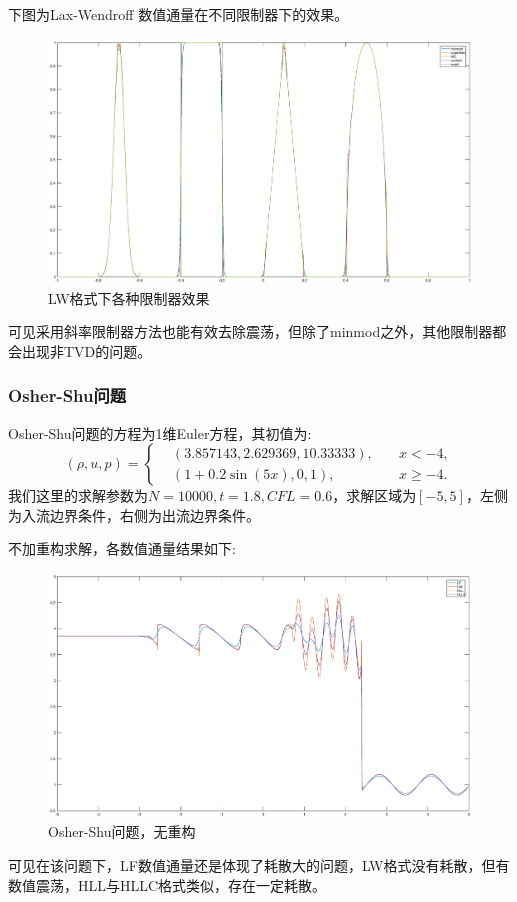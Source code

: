 \documentclass[a4paper,  11pt]{ctexart}
\begin{document}
\newpage 
下图为Lax-Wendroff 数值通量在不同限制器下的效果。
\begin{figure}[H]
  \begin{center}
    \includegraphics[width=\textwidth]{./images/advection_LW_all.eps}
  \end{center}
  \caption{LW格式下各种限制器效果}
\end{figure}
可见采用斜率限制器方法也能有效去除震荡，但除了minmod之外，其他限制器都
会出现非TVD的问题。
\subsubsection{Osher-Shu问题}
Osher-Shu问题的方程为1维Euler方程，其初值为:
\[(\rho,u,p)=\left\{
 \begin{aligned}
  & (3.857143,2.629369,10.33333), \quad & x < -4, \\
  & (1+0.2\sin(5x),0,1),\quad & x \geq -4. 
 \end{aligned}
 \right.
\]
我们这里的求解参数为$N=10000,t=1.8,CFL=0.6$，求解区域为$[-5,5]$，左侧
为入流边界条件，右侧为出流边界条件。

不加重构求解，各数值通量结果如下:
\begin{figure}[H]
  \begin{center}
    \includegraphics[width=\textwidth]{./images/EulerShu-Noreconstruction.eps}
    \caption{Osher-Shu问题，无重构}
  \end{center}
\end{figure}
可见在该问题下，LF数值通量还是体现了耗散大的问题，LW格式没有耗散，但有
数值震荡，HLL与HLLC格式类似，存在一定耗散。
\end{document}
